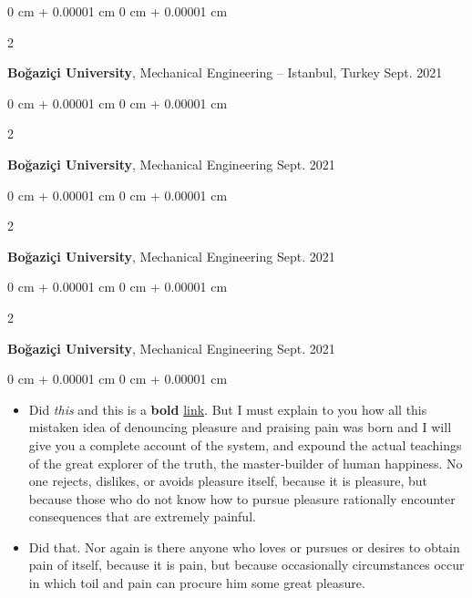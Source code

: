 \documentclass[10pt, letterpaper]{article}
\newenvironment{highlights}{
    \begin{itemize}[
        topsep=0.10 cm,
        parsep=0.10 cm,
        partopsep=0pt,
        itemsep=0pt,
        leftmargin=0 cm + 10pt
    ]
}{
    \end{itemize}
} %
\newenvironment{onecolentry}{
    \begin{adjustwidth}{
        0 cm + 0.00001 cm
    }{
        0 cm + 0.00001 cm
    }
}{
    \end{adjustwidth}
} %
\newenvironment{twocolentry}[2][]{
    \onecolentry
    \def\secondColumn{#2}
    \setcolumnwidth{\fill, 4.5 cm}
    \begin{paracol}{2}
}{
    \switchcolumn \raggedleft \secondColumn
    \end{paracol}
    \endonecolentry
} %
\begin{document}
        \vspace{0.2 cm}

        \begin{twocolentry}{
            Sept. 2021
        }
            \textbf{Boğaziçi University}, Mechanical Engineering -- Istanbul, Turkey\end{twocolentry}



        \vspace{0.2 cm}

        \begin{twocolentry}{
            Sept. 2021
        }
            \textbf{Boğaziçi University}, Mechanical Engineering\end{twocolentry}



        \vspace{0.2 cm}

        \begin{twocolentry}{
            Sept. 2021
        }
            \textbf{Boğaziçi University}, Mechanical Engineering\end{twocolentry}



        \vspace{0.2 cm}

        \begin{twocolentry}{
            Sept. 2021
        }
            \textbf{Boğaziçi University}, Mechanical Engineering\end{twocolentry}

        \vspace{0.10 cm}
        \begin{onecolentry}
            \begin{highlights}
                \item Did \textit{this} and this is a \textbf{bold} \href{https://example.com}{link}. But I must explain to you how all this mistaken idea of denouncing pleasure and praising pain was born and I will give you a complete account of the system, and expound the actual teachings of the great explorer of the truth, the master-builder of human happiness. No one rejects, dislikes, or avoids pleasure itself, because it is pleasure, but because those who do not know how to pursue pleasure rationally encounter consequences that are extremely painful.
                \item Did that. Nor again is there anyone who loves or pursues or desires to obtain pain of itself, because it is pain, but because occasionally circumstances occur in which toil and pain can procure him some great pleasure.
            \end{highlights}
        \end{onecolentry}
\end{document}
